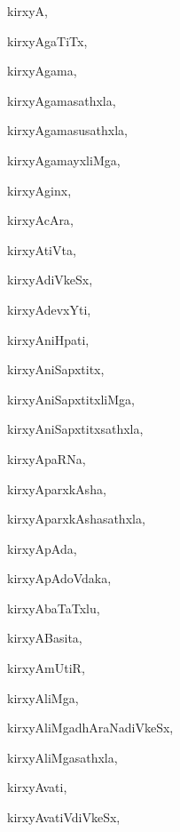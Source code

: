\begin{multicols}{3}
{\noindent
{kirxyA}, \pageref{kirxyA}

\noindent
{kirxyAgaTiTx}, \pageref{kirxyAgaTiTx}

\noindent
{kirxyAgama}, \pageref{kirxyAgama}

\noindent
{kirxyAgamasathxla}, \pageref{kirxyAgamasathxla}

\noindent
{kirxyAgamasusathxla}, \pageref{kirxyAgamasusathxla}

\noindent
{kirxyAgamayxliMga}, \pageref{kirxyAgamayxliMga}

\noindent
{kirxyAginx}, \pageref{kirxyAginx}

\noindent
{kirxyAcAra}, \pageref{kirxyAcAra}

\noindent
{kirxyAtiVta}, \pageref{kirxyAtiVta}

\noindent
{kirxyAdiVkeSx}, \pageref{kirxyAdiVkeSx}

\noindent
{kirxyAdevxYti}, \pageref{kirxyAdevxYti}

\noindent
{kirxyAniHpati}, \pageref{kirxyAniHpati}

\noindent
{kirxyAniSapxtitx}, \pageref{kirxyAniSapxtitx}

\noindent
{kirxyAniSapxtitxliMga}, \pageref{kirxyAniSapxtitxliMga}

\noindent
{kirxyAniSapxtitxsathxla}, \pageref{kirxyAniSapxtitxsathxla}

\noindent
{kirxyApaRNa}, \pageref{kirxyApaRNa}

\noindent
{kirxyAparxkAsha}, \pageref{kirxyAparxkAsha}

\noindent
{kirxyAparxkAshasathxla}, \pageref{kirxyAparxkAshasathxla}

\noindent
{kirxyApAda}, \pageref{kirxyApAda}

\noindent
{kirxyApAdoVdaka}, \pageref{kirxyApAdoVdaka}

\noindent
{kirxyAbaTaTxlu}, \pageref{kirxyAbaTaTxlu}

\noindent
{kirxyABasita}, \pageref{kirxyABasita}

\noindent
{kirxyAmUtiR}, \pageref{kirxyAmUtiR}

\noindent
{kirxyAliMga}, \pageref{kirxyAliMga}

\noindent
{kirxyAliMgadhAraNadiVkeSx}, \pageref{kirxyAliMgadhAraNadiVkeSx}

\noindent
{kirxyAliMgasathxla}, \pageref{kirxyAliMgasathxla}

\noindent
{kirxyAvati}, \pageref{kirxyAvati}

\noindent
{kirxyAvatiVdiVkeSx}, \pageref{kirxyAvatiVdiVkeSx}

}
\end{multicols}
